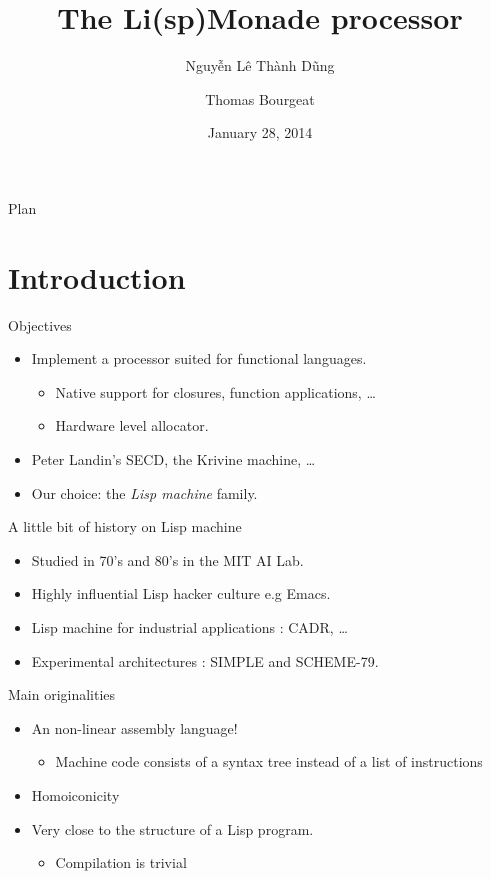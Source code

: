 \documentclass{beamer}
\title{The Li(sp)Monade processor}
\author[ENS Ulm]{Nguyễn Lê Thành Dũng \and Thomas Bourgeat}
\date{January 28, 2014}
\begin{document}
\begin{frame}
  \titlepage
\end{frame}

\begin{frame}{Plan}
  \tableofcontents
\end{frame}

\section{Introduction}

\begin{frame}{Objectives}
\begin{itemize}
\item Implement a processor suited for functional languages.
\begin{itemize}
\item Native support for closures, function applications, \dots
\item Hardware level allocator.
\end{itemize}
\item Peter Landin's SECD, the Krivine machine, \dots
\item Our choice: the \emph{Lisp machine} family.  
\end{itemize}
\end{frame}

\begin{frame}{A little bit of history on Lisp machine}
\begin{itemize}
\item Studied in 70's and 80's in the MIT AI Lab.
\item Highly influential Lisp hacker culture e.g Emacs.
\item Lisp machine for industrial applications : CADR, \dots
\item Experimental architectures : SIMPLE and SCHEME-79.
\end{itemize}
\end{frame}

\begin{frame}{Main originalities}
\begin{itemize}
\item An non-linear assembly language!
\begin{itemize}
\item Machine code consists of a syntax tree instead of a list of instructions
\end{itemize}
\item Homoiconicity
\item Very close to the structure of a Lisp program.
\begin{itemize}
\item Compilation is trivial
\end{itemize}
\end{itemize}
\end{frame}
\end{document}
